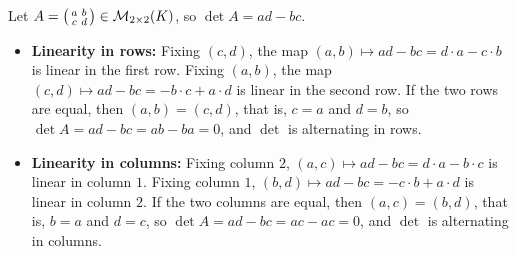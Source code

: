 \begin{exercisesolution}
\label{sol:det_2x2_alternating_bilinear}
Let $A = \left(\begin{smallmatrix} a & b \\ c & d \end{smallmatrix}\right) \in \mathcal{M}_{2 \times 2}(K)$, so $\det A = ad - bc$.

\begin{itemize}
    \item \textbf{Linearity in rows:}
    Fixing $(c, d)$, the map $(a, b) \mapsto ad - bc = d \cdot a - c \cdot b$ is linear in the first row.
    Fixing $(a, b)$, the map $(c, d) \mapsto ad - bc = -b \cdot c + a \cdot d$ is linear in the second row.
    If the two rows are equal, then $(a, b) = (c, d)$, that is, $c = a$ and $d = b$, so $\det A = ad - bc = ab - ba = 0$, and $\det$ is alternating in rows.

    \item \textbf{Linearity in columns:}
    Fixing column $2$, $(a, c) \mapsto ad - bc = d \cdot a - b \cdot c$ is linear in column $1$.
    Fixing column $1$, $(b, d) \mapsto ad - bc = -c \cdot b + a \cdot d$ is linear in column $2$.
    If the two columns are equal, then $(a, c) = (b, d)$, that is, $b = a$ and $d = c$, so $\det A = ad - bc = ac - ac = 0$, and $\det$ is alternating in columns. \qedhere
\end{itemize}
\end{exercisesolution}

